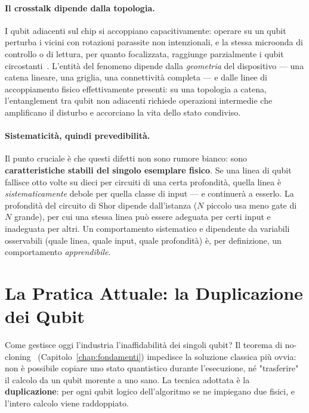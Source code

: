 \begin{onehalfspace}
\paragraph{Il crosstalk dipende dalla topologia.}
I qubit adiacenti sul chip si accoppiano capacitivamente: operare su un qubit perturba i vicini con rotazioni parassite non intenzionali, e la stessa microonda di controllo o di lettura, per quanto focalizzata, raggiunge parzialmente i qubit circostanti~\cite{sarovar2020}. L'entità del fenomeno dipende dalla \emph{geometria} del dispositivo --- una catena lineare, una griglia, una connettività completa --- e dalle linee di accoppiamento fisico effettivamente presenti: su una topologia a catena, l'entanglement tra qubit non adiacenti richiede operazioni intermedie che amplificano il disturbo e accorciano la vita dello stato condiviso.

\paragraph{Sistematicità, quindi prevedibilità.}
Il punto cruciale è che questi difetti non sono rumore bianco: sono \textbf{caratteristiche stabili del singolo esemplare fisico}. Se una linea di qubit fallisce otto volte su dieci per circuiti di una certa profondità, quella linea è \emph{sistematicamente} debole per quella classe di input --- e continuerà a esserlo. La profondità del circuito di Shor dipende dall'istanza ($N$ piccolo usa meno gate di $N$ grande), per cui una stessa linea può essere adeguata per certi input e inadeguata per altri. Un comportamento sistematico e dipendente da variabili osservabili (quale linea, quale input, quale profondità) è, per definizione, un comportamento \emph{apprendibile}.

\section{La Pratica Attuale: la Duplicazione dei Qubit}
\label{sec:duplicazione}

Come gestisce oggi l'industria l'inaffidabilità dei singoli qubit? Il teorema di no-cloning~\cite{wootters1982} (Capitolo~\ref{chap:fondamenti}) impedisce la soluzione classica più ovvia: non è possibile copiare uno stato quantistico durante l'esecuzione, né "trasferire" il calcolo da un qubit morente a uno sano. La tecnica adottata è la \textbf{duplicazione}: per ogni qubit logico dell'algoritmo se ne impiegano due fisici, e l'intero calcolo viene raddoppiato.


\end{onehalfspace}

